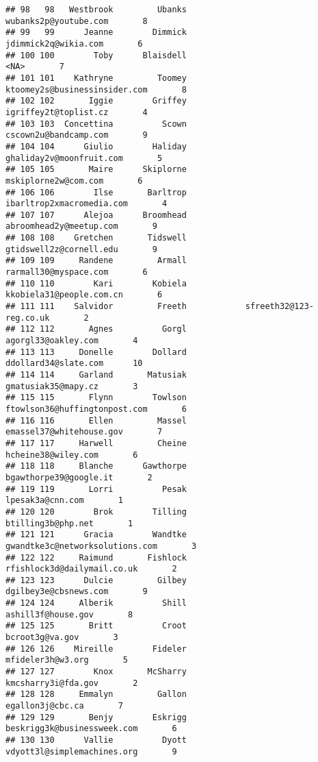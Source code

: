 \documentclass[]{article}
\begin{document}
\begin{verbatim}
## 98   98   Westbrook         Ubanks              wubanks2p@youtube.com       8
## 99   99      Jeanne        Dimmick               jdimmick2q@wikia.com       6
## 100 100        Toby      Blaisdell                               <NA>       7
## 101 101    Kathryne         Toomey      ktoomey2s@businessinsider.com       8
## 102 102       Iggie        Griffey              igriffey2t@toplist.cz       4
## 103 103  Concettina          Scown              cscown2u@bandcamp.com       9
## 104 104      Giulio        Haliday           ghaliday2v@moonfruit.com       5
## 105 105       Maire      Skiplorne               mskiplorne2w@com.com       6
## 106 106        Ilse       Barltrop          ibarltrop2xmacromedia.com       4
## 107 107      Alejoa      Broomhead            abroomhead2y@meetup.com       9
## 108 108    Gretchen       Tidswell            gtidswell2z@cornell.edu       9
## 109 109     Randene         Armall              rarmall30@myspace.com       6
## 110 110        Kari        Kobiela           kkobiela31@people.com.cn       6
## 111 111    Salvidor         Freeth            sfreeth32@123-reg.co.uk       2
## 112 112       Agnes          Gorgl                agorgl33@oakley.com       4
## 113 113     Donelle        Dollard               ddollard34@slate.com      10
## 114 114     Garland       Matusiak                gmatusiak35@mapy.cz       3
## 115 115       Flynn        Towlson      ftowlson36@huffingtonpost.com       6
## 116 116       Ellen         Massel           emassel37@whitehouse.gov       7
## 117 117     Harwell         Cheine                hcheine38@wiley.com       6
## 118 118     Blanche      Gawthorpe             bgawthorpe39@google.it       2
## 119 119       Lorri          Pesak                   lpesak3a@cnn.com       1
## 120 120        Brok        Tilling                 btilling3b@php.net       1
## 121 121      Gracia        Wandtke    gwandtke3c@networksolutions.com       3
## 122 122     Raimund       Fishlock        rfishlock3d@dailymail.co.uk       2
## 123 123      Dulcie         Gilbey              dgilbey3e@cbsnews.com       9
## 124 124     Alberik          Shill                 ashill3f@house.gov       8
## 125 125       Britt          Croot                    bcroot3g@va.gov       3
## 126 126    Mireille        Fideler                  mfideler3h@w3.org       5
## 127 127        Knox       McSharry                kmcsharry3i@fda.gov       2
## 128 128     Emmalyn         Gallon                   egallon3j@cbc.ca       7
## 129 129       Benjy        Eskrigg        beskrigg3k@businessweek.com       6
## 130 130      Vallie          Dyott        vdyott3l@simplemachines.org       9

\end{verbatim}
\end{document}
